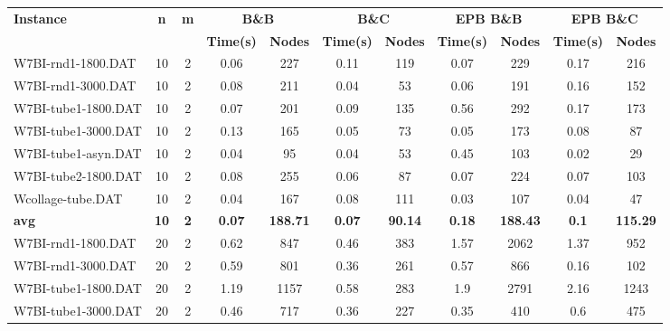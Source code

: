 \begin{table}[!ht]
\centering
\hspace*{-1cm}\begin{tabular}{lcccccccccc}
\toprule
\textbf{Instance} & \textbf{n} & \textbf{m} & \multicolumn{2}{c}{\textbf{B\&B}} & \multicolumn{2}{c}{\textbf{B\&C}}  & \multicolumn{2}{c}{\textbf{EPB B\&B}} & \multicolumn{2}{c}{\textbf{EPB B\&C}} \\

\cmidrule(r){4-5} \cmidrule(r){6-7} \cmidrule(r){8-9} \cmidrule(r){10-11} 
~ & ~ & ~ & \textbf{Time(s)} &\textbf{Nodes} & \textbf{Time(s)} &\textbf{Nodes} & \textbf{Time(s)} &\textbf{Nodes} & \textbf{Time(s)} &\textbf{Nodes}  \\
\midrule

W7BI-rnd1-1800.DAT & 10 & 2 &  \textcolor{blue2}{0.06} & 227 & 0.11 & 119 & 0.07 & 229 & 0.17 & 216 \\
W7BI-rnd1-3000.DAT & 10 & 2 & 0.08 & 211 &  \textcolor{blue2}{0.04} & 53 & 0.06 & 191 & 0.16 & 152 \\
W7BI-tube1-1800.DAT & 10 & 2 &  \textcolor{blue2}{0.07} & 201 & 0.09 & 135 & 0.56 & 292 & 0.17 & 173 \\
W7BI-tube1-3000.DAT & 10 & 2 & 0.13 & 165 &  \textcolor{blue2}{0.05} & 73 &  \textcolor{blue2}{0.05} & 173 & 0.08 & 87 \\
W7BI-tube1-asyn.DAT & 10 & 2 & 0.04 & 95 & 0.04 & 53 & 0.45 & 103 &  \textcolor{blue2}{0.02} & 29 \\
W7BI-tube2-1800.DAT & 10 & 2 & 0.08 & 255 &  \textcolor{blue2}{0.06} & 87 & 0.07 & 224 & 0.07 & 103 \\
Wcollage-tube.DAT & 10 & 2 & 0.04 & 167 & 0.08 & 111 &  \textcolor{blue2}{0.03} & 107 & 0.04 & 47 \\
\cline{1-11} \textbf{avg} & \textbf{10} & \textbf{2} & \textbf{0.07} & \textbf{188.71} & \textbf{0.07} & \textbf{90.14} & \textbf{0.18} & \textbf{188.43} & \textbf{0.1} & \textbf{115.29} \\ \cline{1-11}
W7BI-rnd1-1800.DAT & 20 & 2 & 0.62 & 847 &  \textcolor{blue2}{0.46} & 383 & 1.57 & 2062 & 1.37 & 952 \\
W7BI-rnd1-3000.DAT & 20 & 2 & 0.59 & 801 & 0.36 & 261 & 0.57 & 866 &  \textcolor{blue2}{0.16} & 102 \\
W7BI-tube1-1800.DAT & 20 & 2 & 1.19 & 1157 &  \textcolor{blue2}{0.58} & 283 & 1.9 & 2791 & 2.16 & 1243 \\
W7BI-tube1-3000.DAT & 20 & 2 & 0.46 & 717 & 0.36 & 227 &  \textcolor{blue2}{0.35} & 410 & 0.6 & 475 \\

\end{tabular}
\end{table}
